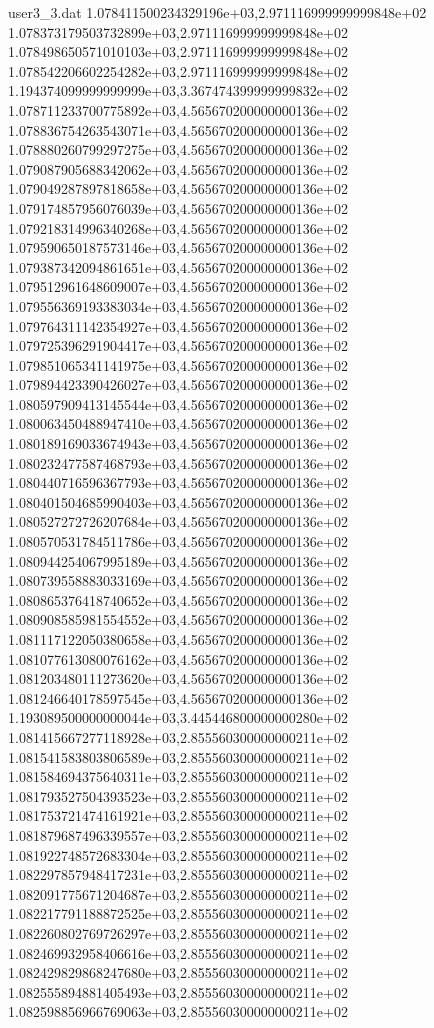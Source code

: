 \begin{filecontents}{user3_3.dat}
1.078411500234329196e+03,2.971116999999999848e+02
1.078373179503732899e+03,2.971116999999999848e+02
1.078498650571010103e+03,2.971116999999999848e+02
1.078542206602254282e+03,2.971116999999999848e+02
1.194374099999999999e+03,3.367474399999999832e+02
1.078711233700775892e+03,4.565670200000000136e+02
1.078836754263543071e+03,4.565670200000000136e+02
1.078880260799297275e+03,4.565670200000000136e+02
1.079087905688342062e+03,4.565670200000000136e+02
1.079049287897818658e+03,4.565670200000000136e+02
1.079174857956076039e+03,4.565670200000000136e+02
1.079218314996340268e+03,4.565670200000000136e+02
1.079590650187573146e+03,4.565670200000000136e+02
1.079387342094861651e+03,4.565670200000000136e+02
1.079512961648609007e+03,4.565670200000000136e+02
1.079556369193383034e+03,4.565670200000000136e+02
1.079764311142354927e+03,4.565670200000000136e+02
1.079725396291904417e+03,4.565670200000000136e+02
1.079851065341141975e+03,4.565670200000000136e+02
1.079894423390426027e+03,4.565670200000000136e+02
1.080597909413145544e+03,4.565670200000000136e+02
1.080063450488947410e+03,4.565670200000000136e+02
1.080189169033674943e+03,4.565670200000000136e+02
1.080232477587468793e+03,4.565670200000000136e+02
1.080440716596367793e+03,4.565670200000000136e+02
1.080401504685990403e+03,4.565670200000000136e+02
1.080527272726207684e+03,4.565670200000000136e+02
1.080570531784511786e+03,4.565670200000000136e+02
1.080944254067995189e+03,4.565670200000000136e+02
1.080739558883033169e+03,4.565670200000000136e+02
1.080865376418740652e+03,4.565670200000000136e+02
1.080908585981554552e+03,4.565670200000000136e+02
1.081117122050380658e+03,4.565670200000000136e+02
1.081077613080076162e+03,4.565670200000000136e+02
1.081203480111273620e+03,4.565670200000000136e+02
1.081246640178597545e+03,4.565670200000000136e+02
1.193089500000000044e+03,3.445446800000000280e+02
1.081415667277118928e+03,2.855560300000000211e+02
1.081541583803806589e+03,2.855560300000000211e+02
1.081584694375640311e+03,2.855560300000000211e+02
1.081793527504393523e+03,2.855560300000000211e+02
1.081753721474161921e+03,2.855560300000000211e+02
1.081879687496339557e+03,2.855560300000000211e+02
1.081922748572683304e+03,2.855560300000000211e+02
1.082297857948417231e+03,2.855560300000000211e+02
1.082091775671204687e+03,2.855560300000000211e+02
1.082217791188872525e+03,2.855560300000000211e+02
1.082260802769726297e+03,2.855560300000000211e+02
1.082469932958406616e+03,2.855560300000000211e+02
1.082429829868247680e+03,2.855560300000000211e+02
1.082555894881405493e+03,2.855560300000000211e+02
1.082598856966769063e+03,2.855560300000000211e+02

\end{filecontents}
